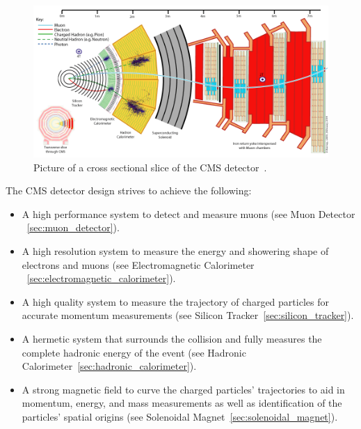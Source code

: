 		
\begin{figure}[h]
\begin{center}
\includegraphics[width=0.8\linewidth]{Figs/CMS_Slice.png}
\caption{\label{fig:cms_slice}
Picture of a cross sectional slice of the CMS detector~\cite{cmspublic}.
}
\end{center}
\end{figure} 

The CMS detector design strives to achieve the following:
\begin{itemize}
\item A high performance system to detect and measure muons (see Muon Detector ~\ref{sec:muon_detector}).
\item A high resolution system to measure the energy and showering shape of electrons and muons (see Electromagnetic Calorimeter ~\ref{sec:electromagnetic_calorimeter}).
\item A high quality system to measure the trajectory of charged particles for accurate momentum measurements (see Silicon Tracker~\ref{sec:silicon_tracker}).
\item A hermetic system that surrounds the collision and fully measures the complete hadronic energy of the event (see Hadronic Calorimeter~\ref{sec:hadronic_calorimeter}).
\item A strong magnetic field to curve the charged particles' trajectories to aid in momentum, energy, and mass measurements as well as identification of the particles' spatial origins (see Solenoidal Magnet~\ref{sec:solenoidal_magnet}).
\end{itemize}

